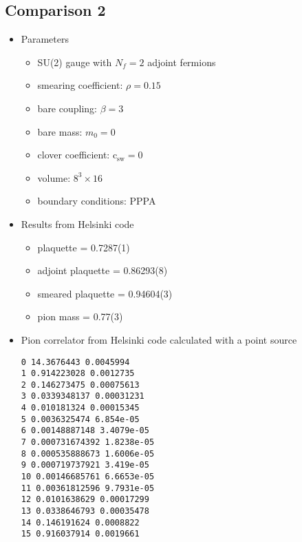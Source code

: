 \documentclass[12pt]{article}
\newcommand{\csw}{\mathrm{c}_\mathrm{sw}}
\begin{document}
\subsection*{Comparison 2}
\begin{itemize}
\item Parameters
\begin{itemize}
 \item SU(2) gauge with $N_f=2$ adjoint fermions
 \item smearing coefficient: $\rho=0.15$
 \item bare coupling: $\beta=3$
 \item bare mass: $m_0=0$
 \item clover coefficient: $\csw=0$
 \item volume: $8^3\times16$
 \item boundary conditions: PPPA
\end{itemize}
\item Results from Helsinki code
\begin{itemize}
 \item plaquette = 0.7287(1)
 \item adjoint plaquette = 0.86293(8)
 \item smeared plaquette = 0.94604(3)
 \item pion mass = 0.77(3)
\end{itemize}
\item Pion correlator from Helsinki code calculated with a point source
\begin{verbatim}
0 14.3676443 0.0045994
1 0.914223028 0.0012735
2 0.146273475 0.00075613
3 0.0339348137 0.00031231
4 0.010181324 0.00015345
5 0.0036325474 6.854e-05
6 0.00148887148 3.4079e-05
7 0.000731674392 1.8238e-05
8 0.000535888673 1.6006e-05
9 0.000719737921 3.419e-05
10 0.00146685761 6.6653e-05
11 0.00361812596 9.7931e-05
12 0.0101638629 0.00017299
13 0.0338646793 0.00035478
14 0.146191624 0.0008822
15 0.916037914 0.0019661
\end{verbatim}
\end{itemize}

\newpage
\end{document}
